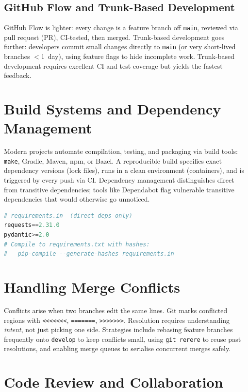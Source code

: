 \subsection{GitHub Flow and Trunk-Based Development}

GitHub Flow is lighter: every change is a feature branch off \texttt{main}, reviewed via pull request (PR), CI-tested, then merged. Trunk-based development goes further: developers commit small changes directly to \texttt{main} (or very short-lived branches $<$1~day), using feature flags to hide incomplete work. Trunk-based development requires excellent CI and test coverage but yields the fastest feedback.


\section{Build Systems and Dependency Management}

Modern projects automate compilation, testing, and packaging via build tools: \texttt{make}, Gradle, Maven, npm, or Bazel. A reproducible build specifies exact dependency versions (lock files), runs in a clean environment (containers), and is triggered by every push via CI. Dependency management distinguishes direct from transitive dependencies; tools like Dependabot flag vulnerable transitive dependencies that would otherwise go unnoticed.

\begin{lstlisting}[language=Python,caption={Reproducible dependencies with pip-tools.}]
# requirements.in  (direct deps only)
requests==2.31.0
pydantic>=2.0
# Compile to requirements.txt with hashes:
#   pip-compile --generate-hashes requirements.in
\end{lstlisting}

\section{Handling Merge Conflicts}

Conflicts arise when two branches edit the same lines. Git marks conflicted regions with \texttt{<<<<<<<}, \texttt{=======}, \texttt{>>>>>>>}. Resolution requires understanding \emph{intent}, not just picking one side. Strategies include rebasing feature branches frequently onto \texttt{develop} to keep conflicts small, using \texttt{git rerere} to reuse past resolutions, and enabling merge queues to serialise concurrent merges safely.

\section{Code Review and Collaboration}

